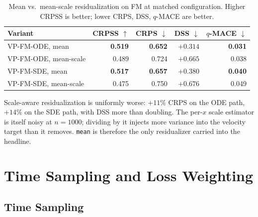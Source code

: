\documentclass{uai2026}
\begin{document}
\begin{table}[!h]
  \centering
  \caption{Mean vs.\ mean-scale residualization on FM at matched configuration. Higher CRPSS is better; lower CRPS, DSS, $q$-MACE are better.}\label{tab:mean-scale}
  \footnotesize
  \begin{tabular}{lrrrr}
    \toprule
    Variant & CRPSS $\uparrow$ & CRPS $\downarrow$ & DSS $\downarrow$ & $q$-MACE $\downarrow$ \\
    \midrule
    VP-FM-ODE, mean       & \textbf{0.519} & \textbf{0.652} & \textbf{$+0.314$} & \textbf{0.031} \\
    VP-FM-ODE, mean-scale & 0.489 & 0.724 & $+0.665$ & 0.038 \\
    VP-FM-SDE, mean       & \textbf{0.517} & \textbf{0.657} & \textbf{$+0.380$} & \textbf{0.040} \\
    VP-FM-SDE, mean-scale & 0.475 & 0.750 & $+0.676$ & 0.049 \\
    \bottomrule
  \end{tabular}
\end{table}

Scale-aware residualization is uniformly worse: $+11\%$ CRPS on the ODE path, $+14\%$ on the SDE path, with DSS more than doubling. The per-$x$ scale estimator is itself noisy at $n=1000$; dividing by it injects more variance into the velocity target than it removes. \texttt{mean} is therefore the only residualizer carried into the headline.

\section{Time Sampling and Loss Weighting}\label{app:t-and-loss}

\subsection{Time Sampling}\label{app:t-sampling}
\end{document}
